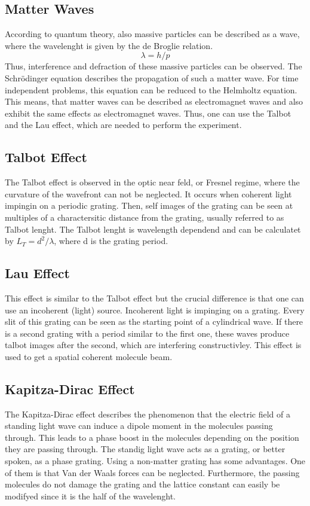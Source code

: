 \documentclass[12pt,a4paper]{article}
\begin{document}
\begin{multicols}{2}
\subsection{Matter Waves}

According to quantum theory, also massive particles can be described as a wave, where the wavelenght is given by the de Broglie relation.
$$\lambda=h/p$$
Thus, interference and defraction of these massive particles can be observed. The Schrödinger equation describes the propagation of such a matter wave. For time independent problems, this equation can be reduced to the Helmholtz equation. This means, that matter waves can be described as electromagnet waves and also exhibit the same effects as electromagnet waves. Thus, one can use the Talbot and the Lau effect, which are needed to perform the experiment.

\subsection{Talbot Effect}

The Talbot effect is observed in the optic near feld, or Fresnel regime, where the curvature of the wavefront can not be neglected. It occurs when coherent light impingin on a periodic grating. Then,  self images of the grating can be seen at multiples of a charactersitic distance from the grating, usually referred to as Talbot lenght. The Talbot lenght is wavelength dependend and can be calculatet by $L_T=d^2/\lambda$, where d is the grating period.

\subsection{Lau Effect}

This effect is similar to the Talbot effect but the crucial difference is that one can use an incoherent (light) source. Incoherent light is impinging on a grating. Every slit of this grating can be seen as the starting point of a cylindrical wave. If there is a second grating with a period similar to the first one, these waves produce talbot images after the second, which are interfering constructivley. This effect is used to get a spatial coherent molecule beam.

\subsection{Kapitza-Dirac Effect}

The Kapitza-Dirac effect describes the phenomenon that the electric field of a standing light wave can induce a dipole moment in the molecules passing through. This leads to a phase boost in the molecules depending on the position they are passing through. The standig light wave acts as a grating, or better spoken, as a phase grating. Using a non-matter grating has some advantages. One of them is that Van der Waals forces can be neglected. Furthermore, the passing molecules do not damage the grating and the lattice constant can easily be modifyed since it is the half of the wavelenght. 


\end{multicols}
\end{document}
